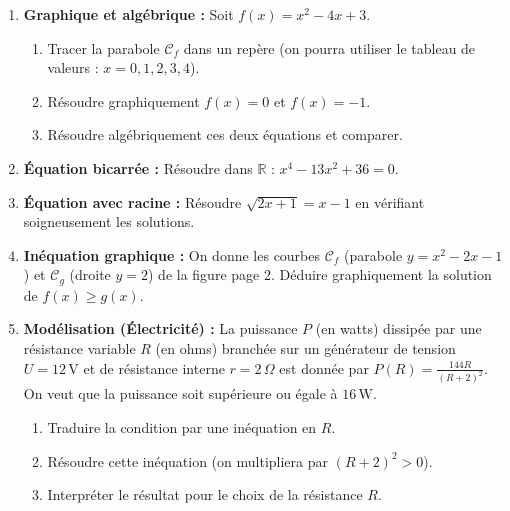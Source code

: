 \documentclass[11pt]{article}
\begin{document}
\begin{exercice}
\begin{enumerate}
\item \textbf{Graphique et algébrique :} Soit $f(x)=x^2-4x+3$. 
\begin{enumerate}
\item Tracer la parabole $\mathcal{C}_f$ dans un repère (on pourra utiliser le tableau de valeurs : $x=0,1,2,3,4$).
\item Résoudre graphiquement $f(x)=0$ et $f(x)=-1$.
\item Résoudre algébriquement ces deux équations et comparer.
\end{enumerate}
\item \textbf{Équation bicarrée :} Résoudre dans $\mathbb{R}$ : $x^4-13x^2+36=0$.
\item \textbf{Équation avec racine :} Résoudre $\sqrt{2x+1}=x-1$ en vérifiant soigneusement les solutions.
\item \textbf{Inéquation graphique :} On donne les courbes $\mathcal{C}_f$ (parabole $y=x^2-2x-1$) et $\mathcal{C}_g$ (droite $y=2$) de la figure page 2. Déduire graphiquement la solution de $f(x) \geq g(x)$.
\item \textbf{Modélisation (Électricité) :} La puissance $P$ (en watts) dissipée par une résistance variable $R$ (en ohms) branchée sur un générateur de tension $U=12\,\text{V}$ et de résistance interne $r=2\,\Omega$ est donnée par $P(R)=\frac{144R}{(R+2)^2}$. On veut que la puissance soit supérieure ou égale à $16\,\text{W}$.
\begin{enumerate}
\item Traduire la condition par une inéquation en $R$.
\item Résoudre cette inéquation (on multipliera par $(R+2)^2>0$).
\item Interpréter le résultat pour le choix de la résistance $R$.
\end{enumerate}
\end{enumerate}
\end{exercice}
\end{document}
